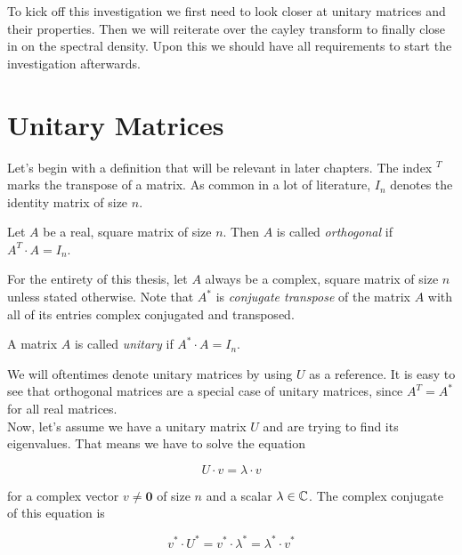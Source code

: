 To kick off this investigation we first need to look closer at unitary matrices and their properties.
Then we will reiterate over the cayley transform to finally close in on the spectral density.
Upon this we should have all requirements to start the investigation afterwards.

\section{Unitary Matrices}

Let's begin with a definition that will be relevant in later chapters.
The index $^T$ marks the transpose of a matrix.
As common in a lot of literature, $I_n$ denotes the identity matrix of size $n$.

\begin{definition}
    Let $A$ be a real, square matrix of size $n$.
    Then $A$ is called \emph{orthogonal} if $A^T \cdot A = I_n$.
\end{definition}

For the entirety of this thesis, let $A$ always be a complex, square matrix of size $n$ unless stated otherwise.
Note that $A^*$ is \emph{conjugate transpose} of the matrix $A$ with all of its entries complex conjugated and transposed.

\begin{definition}
    A matrix $A$ is called \emph{unitary} if $A^* \cdot A = I_n$.
\end{definition}

We will oftentimes denote unitary matrices by using $U$ as a reference.
It is easy to see that orthogonal matrices are a special case of unitary matrices, since $A^T = A^*$ for all real matrices.\\
Now, let's assume we have a unitary matrix $U$ and are trying to find its eigenvalues.
That means we have to solve the equation

\begin{equation} \label{eq:eigenvalue_equation}
    U \cdot v = \lambda \cdot v
\end{equation}

for a complex vector $v \neq \mathbf{0}$ of size $n$ and a scalar $\lambda \in \mathbb{C}$.
The complex conjugate of this equation is

\begin{equation} \label{eq:eigenvalue_equation_complex_conjugate}
    v^* \cdot U^* = v^* \cdot \lambda^* = \lambda^* \cdot v^*
\end{equation}

